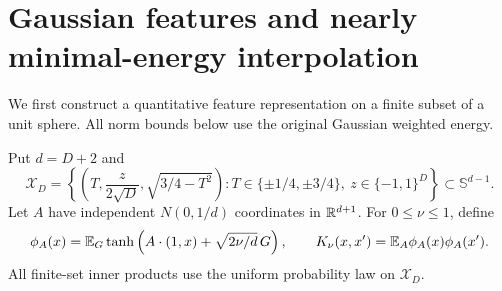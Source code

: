 \section{Gaussian features and nearly minimal-energy interpolation}
\label{sec:gaussian-feature-memorizer}
We first construct a quantitative feature representation on a finite subset of a unit sphere. All norm bounds below use the original Gaussian weighted energy.

Put $d=D+2$ and
\[
 \mathcal X_D=\left\{\left(T,\frac z{2\sqrt D},\sqrt{3/4-T^2}\right):
 T\in\{\pm1/4,\pm3/4\},\ z\in\{-1,1\}^D\right\}\subset\mathbb S^{d-1}.
\]
Let $A$ have independent $N(0,1/d)$ coordinates in $\mathbb R^{d+1}$. For $0\le\nu\le1$, define
\[
 \phi_A(x)=\mathbb E_G\tanh\left(A\cdot(1,x)+\sqrt{2\nu/d}\,G\right),
 \qquad K_\nu(x,x')=\mathbb E_A\phi_A(x)\phi_A(x').
\]
All finite-set inner products use the uniform probability law on $\mathcal X_D$.

